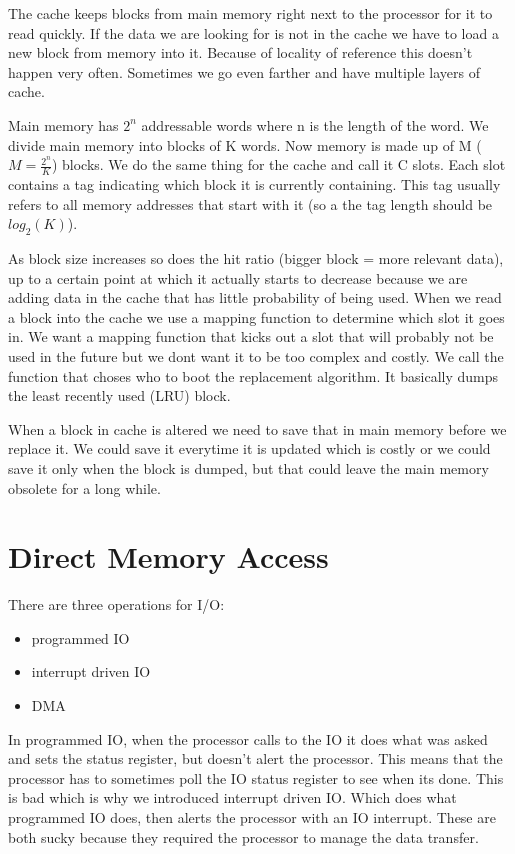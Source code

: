\documentclass[12pt]{article}
\begin{document}
The cache keeps blocks from main memory right next to the processor for it to read quickly. If the data we are looking for is not in the cache we have to load a new block from memory into it. Because of locality of reference this doesn't happen very often. Sometimes we go even farther and have multiple layers of cache.

Main memory has  $2^n$ addressable words where n is the length of the word. We divide main memory into blocks of K words.  Now memory is made up of M ($M=\frac{2^n}{K}$) blocks. We do the same thing for the cache and call it C slots. Each slot contains a tag indicating which block it is currently containing. This tag usually refers to all memory addresses that start with it (so a the tag length should be $log_2(K)$).

As block size increases so does the hit ratio (bigger block = more relevant data), up to a certain point at which it actually starts to decrease because we are adding data in the cache that has little probability of being used. When we read a block into the cache we use a mapping function to determine which slot it goes in. We want a mapping function that kicks out a slot that will probably not be used in the future but we dont want it to be too complex and costly. We call the function that choses who to boot the replacement algorithm. It basically dumps the least recently used (LRU) block.

When a block in cache is altered we need to save that in main memory before we replace it. We could save it everytime it is updated which is costly or we could save it only when the block is dumped, but that could leave the main memory obsolete for a long while.

\section{Direct Memory Access}
There are three operations for I/O:
\begin{itemize}
  \item programmed IO
  \item interrupt driven IO
  \item DMA
\end{itemize}

In programmed IO, when the processor calls to the IO it does what was asked and sets the status register, but doesn't alert the processor. This means that the processor has to sometimes poll the IO status register to see when its done. This is bad which is why we introduced interrupt driven IO. Which does what programmed IO does, then alerts the processor with an IO interrupt. These are both sucky because they required the processor to manage the data transfer.
\end{document}
